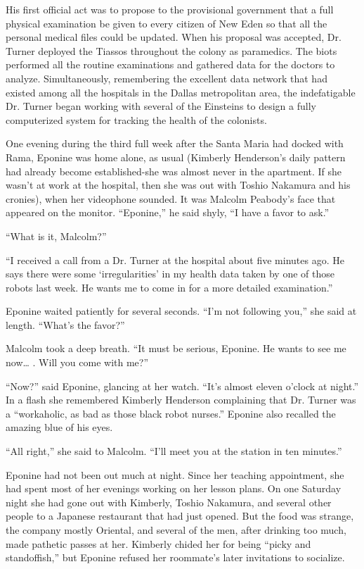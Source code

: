 \documentclass[]{article}
\begin{document}
{His first official act was to propose to the provisional government that a full physical examination be given to every citizen of New Eden so that all the personal medical files could be updated. When his proposal was accepted, Dr. Turner deployed the Tiassos throughout the colony as paramedics. The biots performed all the routine examinations and gathered data for the doctors to analyze. Simultaneously, remembering the excellent data network that had existed among all the hospitals in the Dallas metropolitan area, the indefatigable Dr. Turner began working with several of the Einsteins to design a fully computerized system for tracking the health of the colonists.

One evening during the third full week after the Santa Maria had docked with Rama, Eponine was home alone, as usual (Kimberly Henderson’s daily pattern had already become established-she was almost never in the apartment. If she wasn’t at work at the hospital, then she was out with Toshio Nakamura and his cronies), when her videophone sounded. It was Malcolm Peabody’s face that appeared on the monitor. “Eponine,” he said shyly, “I have a favor to ask.”

“What is it, Malcolm?”

“I received a call from a Dr. Turner at the hospital about five minutes ago. He says there were some ‘irregularities’ in my health data taken by one of those robots last week. He wants me to come in for a more detailed examination.”

Eponine waited patiently for several seconds. “I’m not following you,” she said at length. “What’s the favor?”

Malcolm took a deep breath. “It must be serious, Eponine. He wants to see me now… . Will you come with me?”

“Now?” said Eponine, glancing at her watch. “It’s almost eleven o’clock at night.” In a flash she remembered Kimberly Henderson complaining that Dr. Turner was a “workaholic, as bad as those black robot nurses.” Eponine also recalled the amazing blue of his eyes.

“All right,” she said to Malcolm. “I’ll meet you at the station in ten minutes.”

Eponine had not been out much at night. Since her teaching appointment, she had spent most of her evenings working on her lesson plans. On one Saturday night she had gone out with Kimberly, Toshio Nakamura, and several other people to a Japanese restaurant that had just opened. But the food was strange, the company mostly Oriental, and several of the men, after drinking too much, made pathetic passes at her. Kimberly chided her for being “picky and standoffish,” but Eponine refused her roommate’s later invitations to socialize.

}
\end{document}
